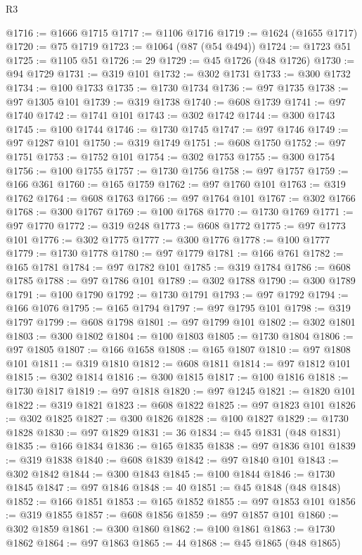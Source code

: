 \begin{lexlean}{R3}
\begin{coremodule}
@1716 := @1666 @1715
@1717 := @1106 @1716
@1719 := @1624 (@1655 @1717)
@1720 := @75 @1719
@1723 := @1064 (@87 (@54 @494))
@1724 := @1723 @51
@1725 := @1105 @51
@1726 := 29
@1729 := @45 @1726 (@48 @1726)
@1730 := @94 @1729
@1731 := @319 @101
@1732 := @302 @1731
@1733 := @300 @1732
@1734 := @100 @1733
@1735 := @1730 @1734
@1736 := @97 @1735
@1738 := @97 @1305 @101
@1739 := @319 @1738
@1740 := @608 @1739
@1741 := @97 @1740
@1742 := @1741 @101
@1743 := @302 @1742
@1744 := @300 @1743
@1745 := @100 @1744
@1746 := @1730 @1745
@1747 := @97 @1746
@1749 := @97 @1287 @101
@1750 := @319 @1749
@1751 := @608 @1750
@1752 := @97 @1751
@1753 := @1752 @101
@1754 := @302 @1753
@1755 := @300 @1754
@1756 := @100 @1755
@1757 := @1730 @1756
@1758 := @97 @1757
@1759 := @166 @361
@1760 := @165 @1759
@1762 := @97 @1760 @101
@1763 := @319 @1762
@1764 := @608 @1763
@1766 := @97 @1764 @101
@1767 := @302 @1766
@1768 := @300 @1767
@1769 := @100 @1768
@1770 := @1730 @1769
@1771 := @97 @1770
@1772 := @319 @248
@1773 := @608 @1772
@1775 := @97 @1773 @101
@1776 := @302 @1775
@1777 := @300 @1776
@1778 := @100 @1777
@1779 := @1730 @1778
@1780 := @97 @1779
@1781 := @166 @761
@1782 := @165 @1781
@1784 := @97 @1782 @101
@1785 := @319 @1784
@1786 := @608 @1785
@1788 := @97 @1786 @101
@1789 := @302 @1788
@1790 := @300 @1789
@1791 := @100 @1790
@1792 := @1730 @1791
@1793 := @97 @1792
@1794 := @166 @1076
@1795 := @165 @1794
@1797 := @97 @1795 @101
@1798 := @319 @1797
@1799 := @608 @1798
@1801 := @97 @1799 @101
@1802 := @302 @1801
@1803 := @300 @1802
@1804 := @100 @1803
@1805 := @1730 @1804
@1806 := @97 @1805
@1807 := @166 @1658
@1808 := @165 @1807
@1810 := @97 @1808 @101
@1811 := @319 @1810
@1812 := @608 @1811
@1814 := @97 @1812 @101
@1815 := @302 @1814
@1816 := @300 @1815
@1817 := @100 @1816
@1818 := @1730 @1817
@1819 := @97 @1818
@1820 := @97 @1245
@1821 := @1820 @101
@1822 := @319 @1821
@1823 := @608 @1822
@1825 := @97 @1823 @101
@1826 := @302 @1825
@1827 := @300 @1826
@1828 := @100 @1827
@1829 := @1730 @1828
@1830 := @97 @1829
@1831 := 36
@1834 := @45 @1831 (@48 @1831)
@1835 := @166 @1834
@1836 := @165 @1835
@1838 := @97 @1836 @101
@1839 := @319 @1838
@1840 := @608 @1839
@1842 := @97 @1840 @101
@1843 := @302 @1842
@1844 := @300 @1843
@1845 := @100 @1844
@1846 := @1730 @1845
@1847 := @97 @1846
@1848 := 40
@1851 := @45 @1848 (@48 @1848)
@1852 := @166 @1851
@1853 := @165 @1852
@1855 := @97 @1853 @101
@1856 := @319 @1855
@1857 := @608 @1856
@1859 := @97 @1857 @101
@1860 := @302 @1859
@1861 := @300 @1860
@1862 := @100 @1861
@1863 := @1730 @1862
@1864 := @97 @1863
@1865 := 44
@1868 := @45 @1865 (@48 @1865)

\end{coremodule}
\end{lexlean}
